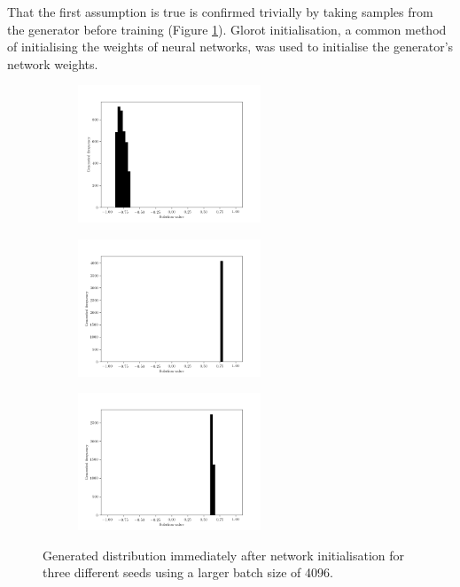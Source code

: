 \documentclass[../../main.tex]{subfiles}
\begin{document}
That the first assumption is true is confirmed trivially by taking samples from the generator before training (Figure \ref{fig:initialisedGenerator}).
Glorot initialisation, a common method of initialising the weights of neural networks, was used to initialise the generator's network weights.
\begin{figure}[H]
    \centering
    \begin{subfigure}[a]{1.\textwidth}
        \centering
        \includegraphics[width=0.6\textwidth]{initialisedGenerator1}
    \end{subfigure}
    \begin{subfigure}[a]{1.\textwidth}
        \centering
        \includegraphics[width=0.6\textwidth]{initialisedGenerator2}
    \end{subfigure}
    \begin{subfigure}[a]{1.\textwidth}
        \centering
        \includegraphics[width=0.6\textwidth]{initialisedGenerator3}
    \end{subfigure}
    \caption{
        Generated distribution immediately after network initialisation for three different seeds using a larger batch size of 4096.
    }
\label{fig:initialisedGenerator}
\end{figure}
\end{document}
